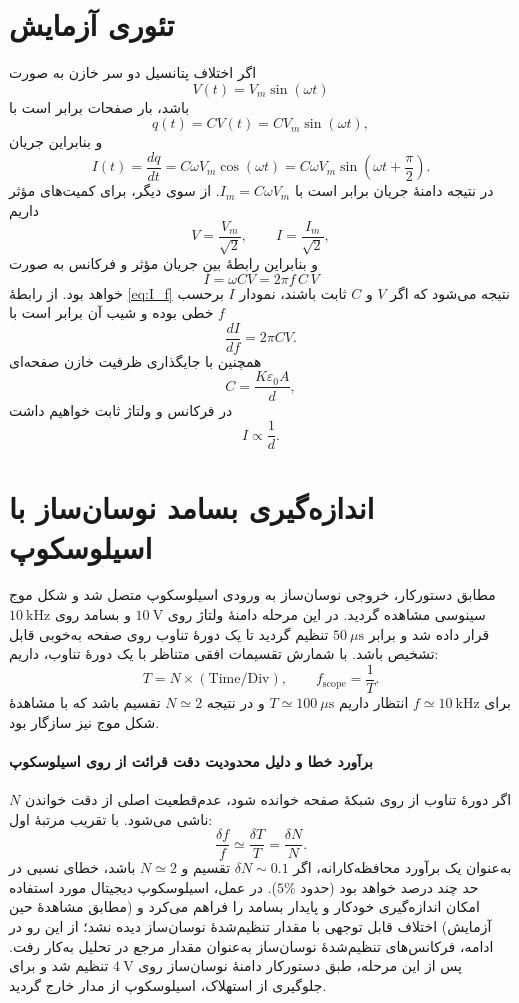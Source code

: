 \documentclass[a4paper, 11pt]{article}
\begin{document}
\section{تئوری آزمایش}

اگر اختلاف پتانسیل دو سر خازن به صورت
\[
V(t)=V_m\sin(\omega t)
\]
باشد، بار صفحات برابر است با
\[
q(t)=CV(t)=CV_m\sin(\omega t),
\]
و بنابراین جریان
\[
I(t)=\frac{dq}{dt}=C\omega V_m\cos(\omega t)=C\omega V_m\sin\!\left(\omega t+\frac{\pi}{2}\right).
\]
در نتیجه دامنهٔ جریان برابر است با $I_m=C\omega V_m$. از سوی دیگر، برای کمیت‌های مؤثر داریم
\[
V=\frac{V_m}{\sqrt{2}},\qquad I=\frac{I_m}{\sqrt{2}},
\]
و بنابراین رابطهٔ بین جریان مؤثر و فرکانس به صورت
\begin{equation}
I = \omega C V = 2\pi f\, C\, V
\label{eq:I_f}
\end{equation}
خواهد بود. از رابطهٔ \eqref{eq:I_f} نتیجه می‌شود که اگر $V$ و $C$ ثابت باشند، نمودار $I$ برحسب $f$ خطی بوده و شیب آن برابر است با
\begin{equation}
\frac{dI}{df}=2\pi C V.
\label{eq:slope}
\end{equation}
همچنین با جایگذاری ظرفیت خازن صفحه‌ای
\[
C = \frac{K\varepsilon_0 A}{d},
\]
در فرکانس و ولتاژ ثابت خواهیم داشت
\[
I \propto \frac{1}{d}.
\]

\section{اندازه‌گیری بسامد نوسان‌ساز با اسیلوسکوپ}

مطابق دستورکار، خروجی نوسان‌ساز به ورودی اسیلوسکوپ متصل شد و شکل موج سینوسی مشاهده گردید. در این مرحله دامنهٔ ولتاژ روی $10~\mathrm{V}$ و بسامد روی $10~\mathrm{kHz}$ قرار داده شد و  برابر $50~\mu\mathrm{s}$ تنظیم گردید تا یک دورهٔ تناوب روی صفحه به‌خوبی قابل تشخیص باشد. با شمارش تقسیمات افقی متناظر با یک دورهٔ تناوب، داریم:
\[
T = N\times(\mathrm{Time/Div}),\qquad f_{\mathrm{scope}}=\frac{1}{T}.
\]
برای $f\simeq 10~\mathrm{kHz}$ انتظار داریم $T\simeq 100~\mu\mathrm{s}$ و در نتیجه $N\simeq 2$ تقسیم باشد که با مشاهدهٔ شکل موج نیز سازگار بود.

\paragraph{برآورد خطا و دلیل محدودیت دقت قرائت از روی اسیلوسکوپ}
اگر دورهٔ تناوب از روی شبکهٔ صفحه خوانده شود، عدم‌قطعیت اصلی از دقت خواندن $N$ ناشی می‌شود. با تقریب مرتبهٔ اول:
\[
\frac{\delta f}{f}\simeq \frac{\delta T}{T}=\frac{\delta N}{N}.
\]
به‌عنوان یک برآورد محافظه‌کارانه، اگر $\delta N \sim 0.1$ تقسیم و $N\simeq 2$ باشد، خطای نسبی در حد چند درصد خواهد بود (حدود $5\%$). در عمل، اسیلوسکوپ دیجیتال مورد استفاده امکان اندازه‌گیری خودکار و پایدار بسامد را فراهم می‌کرد و (مطابق مشاهدهٔ حین آزمایش) اختلاف قابل توجهی با مقدار تنظیم‌شدهٔ نوسان‌ساز دیده نشد؛ از این رو در ادامه، فرکانس‌های تنظیم‌شدهٔ نوسان‌ساز به‌عنوان مقدار مرجع در تحلیل به‌کار رفت. پس از این مرحله، طبق دستورکار دامنهٔ نوسان‌ساز روی $4~\mathrm{V}$ تنظیم شد و برای جلوگیری از استهلاک، اسیلوسکوپ از مدار خارج گردید.
\end{document}
